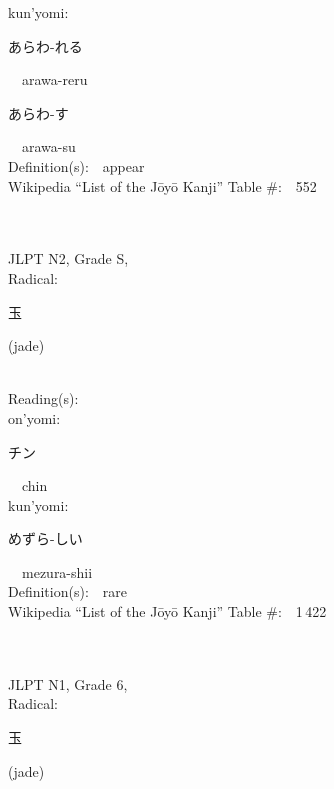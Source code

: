 \begin{multicols}{2}
{\hspace*{1em}}kun'yomi:\ \ \\
{\hspace*{2em}}{\begin{CJK}{UTF8}{min} あらわ-れる \end{CJK}}\ \ arawa-reru\ \ \\
{\hspace*{2em}}{\begin{CJK}{UTF8}{min} あらわ-す \end{CJK}}\ \ arawa-su\ \ \\
Definition(s):\ \ appear \\
Wikipedia ``List of the J\=oy\=o Kanji'' Table \#:\ \ 552 \\
\ \ \\
{\fontsize{34pt}{40pt}  }\ \ \\  %
{JLPT N2, Grade S, \\Radical:\ \ {\begin{CJK}{UTF8}{min} 玉 \end{CJK}} (jade) } \\
Reading(s):\ \ \\
{\hspace*{1em}}on'yomi:\ \ \\
{\hspace*{2em}}{\begin{CJK}{UTF8}{min} チン \end{CJK}}\ \ chin\ \ \\
{\hspace*{1em}}kun'yomi:\ \ \\
{\hspace*{2em}}{\begin{CJK}{UTF8}{min} めずら-しい \end{CJK}}\ \ mezura-shii\ \ \\
Definition(s):\ \ rare \\
Wikipedia ``List of the J\=oy\=o Kanji'' Table \#:\ \ 1\,422 \\
\ \ \\
{\fontsize{34pt}{40pt}  }\ \ \\  %
{JLPT N1, Grade 6, \\Radical:\ \ {\begin{CJK}{UTF8}{min} 玉 \end{CJK}} (jade) } \\

\end{multicols}
